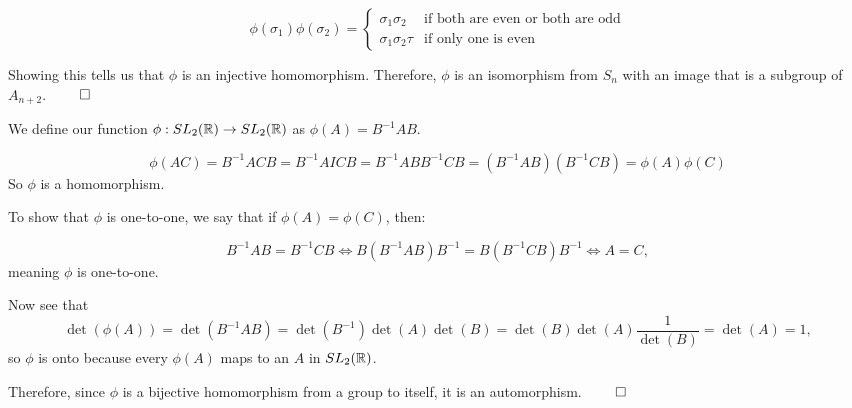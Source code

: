 \documentclass[12pt]{report}
\begin{document}
$$\phi(\sigma_1)\phi(\sigma_2) =  \begin{cases} 
    \sigma_1\sigma_2 & \text{if both are even or both are odd} \\
    \sigma_1\sigma_2\tau & \text{if only one is even}
 \end{cases}
$$

Showing this tells us that $\phi$ is an injective homomorphism. Therefore, $\phi$ is an isomorphism from $S_n$ with an image that is a subgroup of $A_{n+2}$. $\qed$

\sol We define our function $\phi : SL_2(\RR) \to SL_2(\RR)$ as $\phi(A) = B^{-1}AB$. 

$$\phi(AC) = B^{-1}ACB = B^{-1}AICB = B^{-1}ABB^{-1}CB = (B^{-1}AB)(B^{-1}CB) = \phi(A)\phi(C)$$
So $\phi$ is a homomorphism.

To show that $\phi$ is one-to-one, we say that if $\phi(A) = \phi(C)$, then:

$$B^{-1}AB = B^{-1}CB \Longleftrightarrow B(B^{-1}AB)B^{-1} = B(B^{-1}CB)B^{-1} \Longleftrightarrow A = C,$$ meaning $\phi$ is one-to-one.

Now see that
$$\det(\phi(A))=\det(B^{-1}AB)=\det(B^{-1})\det(A)\det(B)=\det(B)\det(A)\frac{1}{\det(B)}=\det(A)= 1,$$
so $\phi$ is onto because every $\phi(A)$ maps to an $A$ in $SL_2(\RR)$.

Therefore, since $\phi$ is a bijective homomorphism from a group to itself, it is an automorphism. $\qed$
\end{document}
